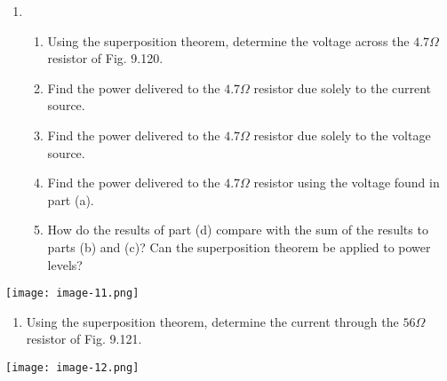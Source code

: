 \documentclass{book}
\begin{document}
\begin{enumerate}
\def\labelenumi{\arabic{enumi}.}
\item
  \begin{enumerate}
  \def\labelenumii{\alph{enumii}.}
  \item
    Using the superposition theorem, determine the voltage across the
    \(4.7 \Omega\) resistor of Fig. 9.120.
  \item
    Find the power delivered to the \(4.7 \Omega\) resistor due solely
    to the current source.
  \item
    Find the power delivered to the \(4.7 \Omega\) resistor due solely
    to the voltage source.
  \item
    Find the power delivered to the \(4.7 \Omega\) resistor using the
    voltage found in part (a).
  \item
    How do the results of part (d) compare with the sum of the results
    to parts (b) and (c)? Can the superposition theorem be applied to
    power levels?
  \end{enumerate}
\end{enumerate}

\texttt{[image: image-11.png]}

\begin{enumerate}
\def\labelenumi{\arabic{enumi}.}
\setcounter{enumi}{2}
\tightlist
\item
  Using the superposition theorem, determine the current through the
  \(56 \Omega\) resistor of Fig. 9.121.
\end{enumerate}

\texttt{[image: image-12.png]}
\end{document}
